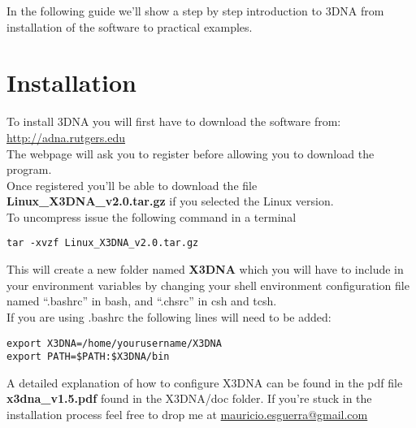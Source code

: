 \maketitle

\label{basics}
In the following guide we'll show  a step by step introduction to 3DNA
from installation of the software to practical examples.

\section{Installation}
To install 3DNA you will first have to download the software from:\\

\url{http://adna.rutgers.edu}\\

\noindent The webpage will ask you to register before allowing you to
download the program.\\
Once   registered    you'll   be    able   to   download    the   file
\textbf{Linux\_X3DNA\_v2.0.tar.gz} if you  selected the Linux version.\\
To uncompress issue the following command in a terminal
\begin{Verbatim}
tar -xvzf Linux_X3DNA_v2.0.tar.gz
\end{Verbatim}
This will create a new folder named \textbf{X3DNA} which you will have
to  include  in your  environment  variables  by  changing your  shell
environment  configuration   file  named  ``.bashrc''   in  bash,  and
``.chsrc'' in csh and tcsh.\\ 
If you are using .bashrc the following lines will need to be added:
\begin{Verbatim}
export X3DNA=/home/yourusername/X3DNA
export PATH=$PATH:$X3DNA/bin
\end{Verbatim}
A detailed explanation  of how to configure X3DNA can  be found in the
pdf file  \textbf{x3dna\_v1.5.pdf} found  in the X3DNA/doc  folder. If
you're  stuck in  the installation  process feel  free to  drop  me at
\url{mauricio.esguerra@gmail.com}

